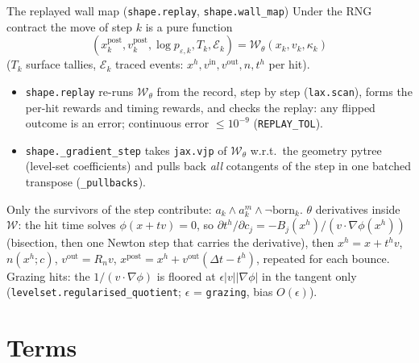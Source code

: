 \documentclass[10pt,aspectratio=169]{beamer}
\newcommand{\code}[1]{\texttt{\small #1}}
\newcommand{\pth}{\mathrm{post}}
\begin{document}
\begin{frame}{The replayed wall map (\code{shape.replay}, \code{shape.wall\_map})}
Under the RNG contract the move of step $k$ is a pure function
\[
(x^\pth_k, v^\pth_k, \log p_{\varepsilon,k}, T_k, \mathcal E_k) = \mathcal W_\theta(x_k, v_k, \kappa_k)
\]
($T_k$ surface tallies, $\mathcal E_k$ traced events: $x^h, v^{\mathrm{in}}, v^{\mathrm{out}}, n, t^h$ per hit).
\begin{itemize}
\item \code{shape.replay} re-runs $\mathcal W_\theta$ from the record, step by step
  (\code{lax.scan}), forms the per-hit rewards and timing rewards, and checks the replay:
  any flipped outcome is an error; continuous error $\le 10^{-9}$ (\code{REPLAY\_TOL}).
\item \code{shape.\_gradient\_step} takes \code{jax.vjp} of $\mathcal W_\theta$ w.r.t.\ the geometry
  pytree (level-set coefficients) and pulls back \emph{all} cotangents of the step in
  one batched transpose (\code{\_pullbacks}).
\end{itemize}
Only the survivors of the step contribute: $a_k \wedge a^m_k \wedge \neg\mathrm{born}_k$.
$\theta$ derivatives inside $\mathcal W$: the hit time solves $\phi(x + t v) = 0$, so
$\partial t^h/\partial c_j = -B_j(x^h)/(v\cdot\nabla\phi(x^h))$
(bisection, then one Newton step that carries the derivative),
then $x^h = x + t^h v$, $n(x^h; c)$, $v^{\mathrm{out}} = R_n v$,
$x^\pth = x^h + v^{\mathrm{out}}(\Delta t - t^h)$, repeated for each bounce.
Grazing hits: the $1/(v\cdot\nabla\phi)$ is floored at $\epsilon|v||\nabla\phi|$ in the tangent only
(\code{levelset.regularised\_quotient}; $\epsilon$ = \code{grazing}, bias $O(\epsilon)$).
\end{frame}

\section{Terms}
\end{document}
